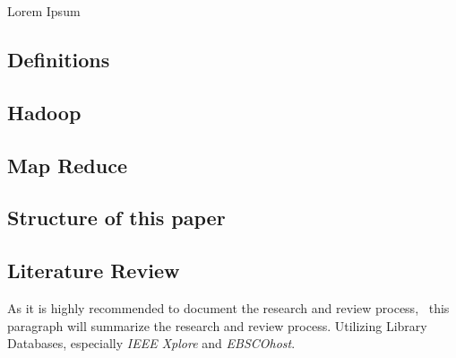 Lorem Ipsum

\subsection{Definitions}
\subsection{Hadoop}
\subsection{Map Reduce}
\subsection{Structure of this paper}
\subsection{Literature Review}
	As it is highly recommended to document the research and review process,~\cite{brocke09} this paragraph will summarize the research and review process.
	Utilizing Library Databases, especially \emph{IEEE Xplore} and \emph{EBSCOhost}. 